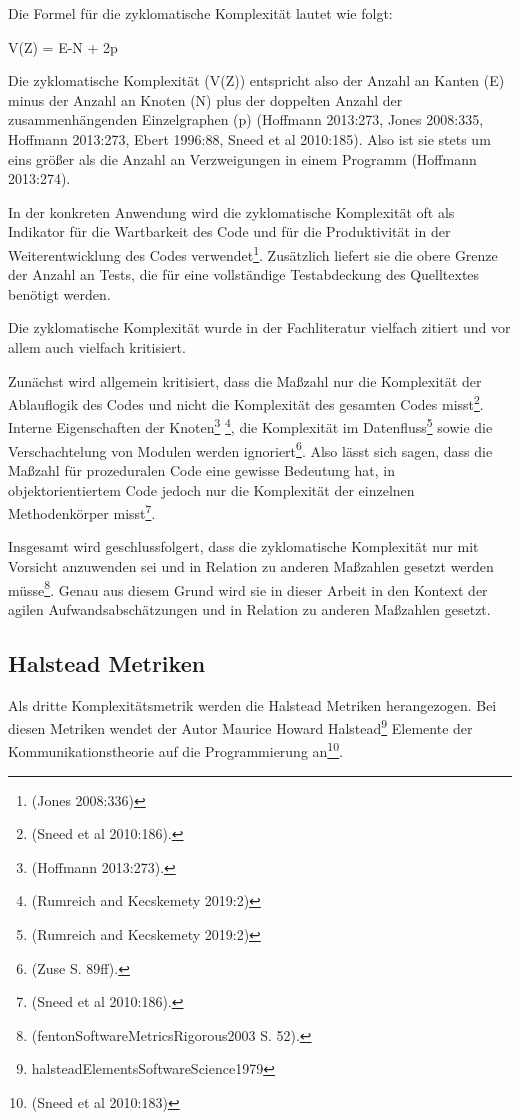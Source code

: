 Die Formel für die zyklomatische Komplexität lautet wie folgt:

V(Z) = \textbar E\textbar-\textbar N\textbar{} + 2p

Die zyklomatische Komplexität (V(Z)) entspricht also der Anzahl an
Kanten (E) minus der Anzahl an Knoten (N) plus der doppelten Anzahl der
zusammenhängenden Einzelgraphen (p) (Hoffmann 2013:273, Jones 2008:335,
Hoffmann 2013:273, Ebert 1996:88, Sneed et al 2010:185). Also ist sie
stets um eins größer als die Anzahl an Verzweigungen in einem Programm
(Hoffmann 2013:274).

In der konkreten Anwendung wird die zyklomatische Komplexität oft als
Indikator für die Wartbarkeit des Code und für die Produktivität in der
Weiterentwicklung des Codes verwendet\footnote{(Jones 2008:336)}.
Zusätzlich liefert sie die obere Grenze der Anzahl an Tests, die für
eine vollständige Testabdeckung des Quelltextes benötigt werden.

Die zyklomatische Komplexität wurde in der Fachliteratur vielfach
zitiert und vor allem auch vielfach kritisiert.

Zunächst wird allgemein kritisiert, dass die Maßzahl nur die Komplexität
der Ablauflogik des Codes und nicht die Komplexität des gesamten Codes
misst\footnote{(Sneed et al 2010:186).}. Interne Eigenschaften der
Knoten\footnote{(Hoffmann 2013:273).} \footnote{(Rumreich and Kecskemety
  2019:2)}, die Komplexität im Datenfluss\footnote{(Rumreich and
  Kecskemety 2019:2)} sowie die Verschachtelung von Modulen werden
ignoriert\footnote{(Zuse S. 89ff).}. Also lässt sich sagen, dass die
Maßzahl für prozeduralen Code eine gewisse Bedeutung hat, in
objektorientiertem Code jedoch nur die Komplexität der einzelnen
Methodenkörper misst\footnote{(Sneed et al 2010:186).}.

Insgesamt wird geschlussfolgert, dass die zyklomatische Komplexität nur
mit Vorsicht anzuwenden sei und in Relation zu anderen Maßzahlen gesetzt
werden müsse\footnote{(fentonSoftwareMetricsRigorous2003 S. 52).}. Genau
aus diesem Grund wird sie in dieser Arbeit in den Kontext der agilen
Aufwandsabschätzungen und in Relation zu anderen Maßzahlen gesetzt.

\subsection{Halstead Metriken}\label{Halstead-Metriken}

Als dritte Komplexitätsmetrik werden die Halstead Metriken herangezogen.
Bei diesen Metriken wendet der Autor Maurice Howard Halstead\footnote{halsteadElementsSoftwareScience1979}
Elemente der Kommunikationstheorie auf die Programmierung an\footnote{(Sneed
  et al 2010:183)}.

